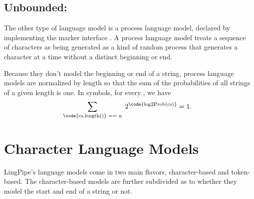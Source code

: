 \subsection{Unbounded: }

The other type of language model is a process language model, declared
by implementing the marker interface .  A
process language model treats a sequence of characters as being
generated as a kind of random process that generates a character at a
time without a distinct beginning or end.  

Because they don't model the beginning or end of a string, process
language models are normalized by length so that the sum of the
probabilities of all strings of a given length is one.  In symbols,
for every , we have
%
\begin{equation}
\sum_{\text{\code{cs.length()} == n}} \hspace*{3pt} 2^{\text{\code{log2Prob(cs)}}} = 1.
\end{equation}
%


\section{Character Language Models}

LingPipe's language models come in two main flavors, character-based
and token-based.  The character-based models are further subdivided as
to whether they model the start and end of a string or not.






